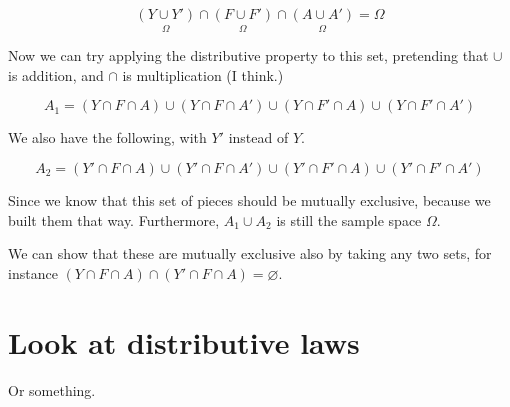 \documentclass{article}
\begin{document}
\[
\underset{\Omega}{(Y\cup Y')}\cap\underset{\Omega}{(F\cup F')}\cap\underset{\Omega}{(A\cup A')} = \Omega
\]

Now we can try applying the distributive property to this set,
pretending that $\cup$ is addition, and $\cap$ is multiplication (I
think.)

\[
A_1 = (Y\cap F\cap A)\cup(Y\cap F\cap A')\cup(Y\cap F'\cap A)\cup(Y\cap F'\cap A')
\]

We also have the following, with $Y'$ instead of $Y$.

\[
A_2 = (Y'\cap F\cap A)\cup(Y'\cap F\cap A')\cup(Y'\cap F'\cap A)\cup(Y'\cap F'\cap A')
\]

Since we know that this set of pieces should be mutually exclusive,
because we built them that way. Furthermore, $A_1\cup A_2$ is still
the sample space $\Omega$.

We can show that these are mutually exclusive also by taking any two
sets, for instance
$(Y\cap{}F\cap{}A)\cap(Y'\cap{}F\cap{}A)=\varnothing$.

\section*{Look at distributive laws}

Or something.
\end{document}
